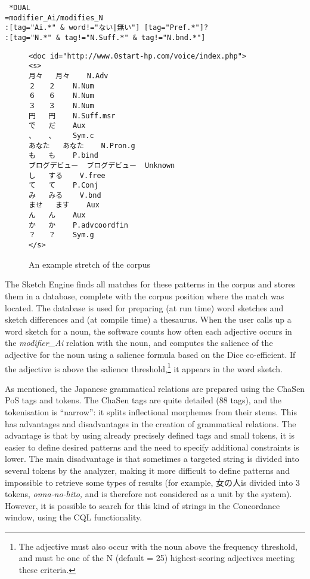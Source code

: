 \documentclass[english]{jnlp_1.4}
\begin{document}
\texttt{
*DUAL\\
\indent\indent
=modifier\_Ai/modifies\_N\\
\indent{}:[tag="Ai.*" \& word!="ない|無い"] [tag="Pref.*"]?
\\\indent{}:[tag="N.*" \& tag!="N.Suff.*" \& tag!="N.bnd.*"]}

\begin{figure}[t]
\begin{center}
\begin{minipage}{240pt}
\begin{verbatim}
<doc id="http://www.0start-hp.com/voice/index.php">
<s>
月々   月々    N.Adv
２   ２    N.Num
６   ６    N.Num
３   ３    N.Num
円   円    N.Suff.msr
で   だ    Aux
、   、    Sym.c
あなた   あなた    N.Pron.g
も   も    P.bind
ブログデビュー  ブログデビュー  Unknown
し   する    V.free
て   て    P.Conj
み   みる    V.bnd
ませ   ます    Aux
ん   ん    Aux
か   か    P.advcoordfin
？   ？    Sym.g
</s>
\end{verbatim}
\end{minipage}
\caption{An example stretch of the corpus}
\label{fig2}
\end{center}
\end{figure}

The Sketch Engine finds all matches for these patterns in the corpus and stores them in a database, complete with the corpus position where the match was located. The database is used for preparing (at run time) word sketches and sketch differences and (at compile time) a thesaurus. When the user calls up a word sketch for a noun, the software counts how often each adjective occurs in the \textit{modifier\_Ai} relation with the noun, and computes the salience of the adjective for the noun using a salience formula based on the Dice co-efficient. If the adjective is above the salience threshold,\footnote{
	The adjective must also occur with the noun above the frequency threshold, and must be one of the N (default = 25) highest-scoring adjectives meeting these criteria.
} it appears in the word sketch.

As mentioned, the Japanese grammatical relations are prepared using
the ChaSen PoS tags and tokens. The ChaSen tags are quite detailed (88 tags), and the tokenisation is ``narrow'': it splits inflectional morphemes from their stems. This has advantages and disadvantages in the creation of grammatical relations. The advantage is that by using already precisely defined tags and small tokens, it is easier to define desired patterns and the need to specify additional constraints is lower. The main disadvantage is that sometimes a targeted string is divided into several tokens by the analyzer, making it more difficult to define patterns and impossible to retrieve some types of results (for example, 女の人is divided into 3 tokens, \textit{onn}\textit{a}\textit{-no}\textit{-}\textit{hito, }and is therefore not considered as a unit by the system). However, it is possible to search for this kind of strings in the Concordance window, using the CQL functionality.
\end{document}
